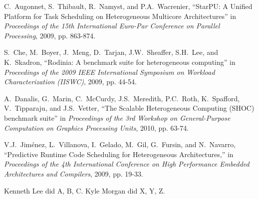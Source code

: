 \documentclass[journal]{IEEEtran}
\begin{document}
\begin{thebibliography}{1}

C.~Augonnet, S.~Thibault, R.~Namyst, and P.A.~Wacrenier,
``StarPU: A Unified Platform for Task Scheduling on Heterogeneous Multicore Architectures'' in
\emph{Proceedings of the 15th International Euro-Par Conference on Parallel Processing}, 2009, pp. 863-874.

S.~Che, M.~Boyer, J.~Meng, D.~Tarjan, J.W.~Sheaffer, S.H.~Lee, and K.~Skadron,
``Rodinia: A benchmark suite for heterogeneous computing'' in
\emph{Proceedings of the 2009 IEEE International Symposium on Workload Characterization (IISWC)}, 2009, pp. 44-54.

A.~Danalis, G.~Marin, C.~McCurdy, J.S.~Meredith, P.C.~Roth, K.~Spafford, V.~Tipparaju, and J.S.~Vetter,
``The Scalable Heterogeneous Computing (SHOC) benchmark suite'' in
\emph{Proceedings of the 3rd Workshop on General-Purpose Computation on Graphics Processing Units}, 2010, pp. 63-74.

V.J.~Jiménez, L.~Villanova, I.~Gelado, M.~Gil, G.~Fursin, and N.~Navarro,
``Predictive Runtime Code Scheduling for Heterogeneous Architectures,'' in
\emph{Proceedings of the 4th International Conference on High Performance Embedded
Architectures and Compilers}, 2009, pp. 19-33.

\end{thebibliography}

\newpage
{}
Kenneth Lee did A, B, C.  Kyle Morgan did X, Y, Z.
\end{document}

